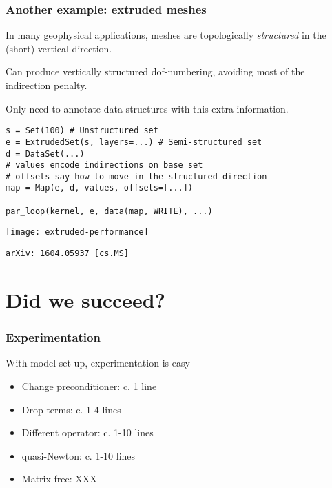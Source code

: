 \documentclass[presentation]{beamer}
\newcommand{\arxivlink}[2]{%
  \href{http://www.arxiv.org/abs/#1}%
  {{\small\texttt{arXiv:\,#1\,[#2]}}}%
}
\begin{document}
\begin{frame}[fragile]
  \frametitle{Another example: extruded meshes}
  In many geophysical applications, meshes are topologically \emph{structured} in
  the (short) vertical direction.

  Can produce vertically structured dof-numbering, avoiding most of
  the indirection penalty.

  Only need to annotate data structures with this extra information.
\begin{verbatim}
s = Set(100) # Unstructured set
e = ExtrudedSet(s, layers=...) # Semi-structured set
d = DataSet(...)
# values encode indirections on base set
# offsets say how to move in the structured direction
map = Map(e, d, values, offsets=[...])

par_loop(kernel, e, data(map, WRITE), ...)
\end{verbatim}
\end{frame}

\begin{frame}
  \begin{center}
    \texttt{[image: extruded-performance]}

    \cite{Bercea:2016} \arxivlink{1604.05937}{cs.MS}
  \end{center}
\end{frame}


\section{Did we succeed?}

\begin{frame}
  \frametitle{Experimentation}
  
  With model set up, experimentation is easy

  \begin{itemize}
  \item Change preconditioner: c. 1 line
  \item Drop terms: c. 1-4 lines
  \item Different operator: c. 1-10 lines
  \item quasi-Newton: c. 1-10 lines
  \item Matrix-free: XXX
  \end{itemize}
\end{frame}
\end{document}
